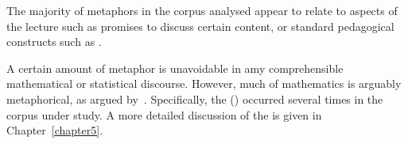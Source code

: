 The majority of metaphors in the corpus analysed appear to relate to
 aspects of the lecture such as promises to discuss
certain content, or standard pedagogical constructs such as
.

A certain amount of metaphor is unavoidable in amy comprehensible
mathematical or statistical discourse.  However, much of mathematics
is arguably metaphorical, as argued by~.
Specifically, the  (\bmi)
occurred several times in the corpus under study.  A more detailed
discussion of the \bmi is given in Chapter~\ref{chapter5}.




%
%

%

